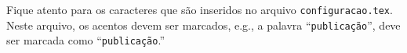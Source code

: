 \begin{marker}
Fique atento para os caracteres que são inseridos no arquivo {\tt configuracao.tex}. Neste arquivo, os acentos devem ser marcados, e.g., a palavra ``{\tt publicação}'', deve ser marcada como ``\texttt{publicaç\~{a}o}.''
\end{marker}

%
%
